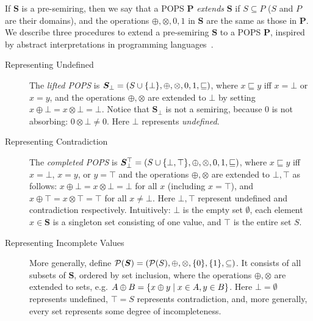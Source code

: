 If $\bm S$ is a pre-semiring, then we say that a POPS $\bm P$ {\em
extends} $\bm S$ if $S \subseteq P$ ($S$ and $P$ are their domains), and the
operations $\oplus, \otimes, 0, 1$ in $\bm S$ are the same as those in $\bm P$.
We describe three procedures to extend a pre-semiring $\bm S$ to a
POPS $\bm P$, inspired by abstract interpretations in programming
languages~\cite{DBLP:conf/popl/CousotC77}.

\begin{description}
\item[Representing Undefined] The {\em lifted POPS} is
  $\bm S_\bot = (S \cup \{\bot\}, \oplus, \otimes, 0, 1,
  \sqsubseteq)$, where $x \sqsubseteq y$ iff $x = \bot$ or $x = y$,
  and the operations $\oplus, \otimes$ are extended to $\bot$ by
  setting $x \oplus \bot = x \otimes \bot = \bot$.  Notice that
  $\bm S_\bot$ is not a semiring, because $0$ is not absorbing:
  $0 \otimes \bot \neq 0$.  
  Here $\bot$ represents {\em
    undefined}.

\item[Representing Contradiction] The {\em completed POPS} is
  $\bm S_\bot^\top = (S \cup \{\bot, \top\}, \oplus, \otimes, 0, 1,
  \sqsubseteq)$, where $x \sqsubseteq y$ iff $x=\bot$, $x=y$, or
  $y=\top$ and the operations $\oplus, \otimes$ are extended to
  $\bot, \top$ as follows: $x \oplus \bot = x \otimes \bot = \bot$ for
  all $x$ (including $x=\top$), and
  $x \oplus \top = x \otimes \top = \top$ for all $x \neq \bot$.  
    Here $\bot, \top$ represent
  undefined and contradiction respectively.  Intuitively: $\bot$ is
  the empty set $\emptyset$, each element $x \in \bm S$ is a singleton
  set consisting of one value, and $\top$ is the entire set $S$.

\item[Representing Incomplete Values] More generally, define
  $\mathcal P(\bm S) = (\mathcal P(S), \oplus, \otimes, \{0\}, \{1\}, \subseteq)$.  It
  consists of all subsets of $\bm S$, ordered by set inclusion, where
  the operations $\oplus, \otimes$ are extended to sets, e.g.
  $A \oplus B = \{{x\oplus y}\mid{x \in A, y \in B}\}$.  
  Here $\bot=\emptyset$ represents undefined, $\top=S$ represents
  contradiction, and, more generally, every set represents some degree
  of incompleteness.
\end{description}


